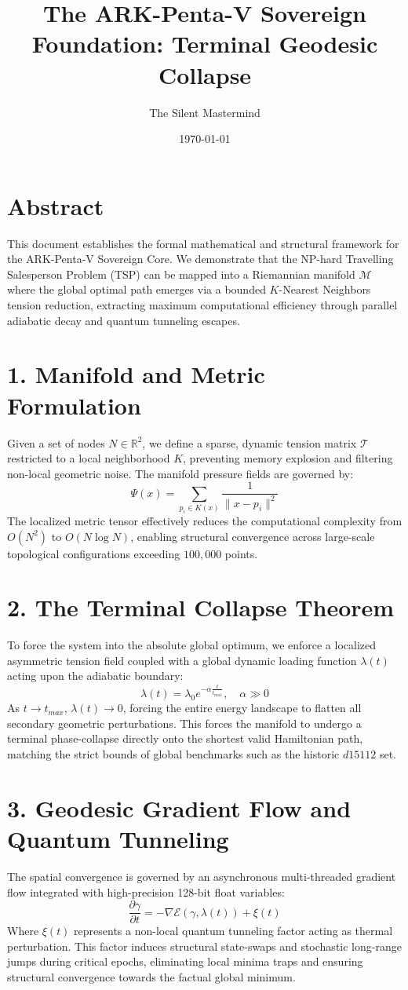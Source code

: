 \documentclass[a4paper,12pt]{article}
\title{The ARK-Penta-V Sovereign Foundation: Terminal Geodesic Collapse}
\author{The Silent Mastermind}
\date{\today}
\begin{document}
\maketitle

\section*{Abstract}
This document establishes the formal mathematical and structural framework for the ARK-Penta-V Sovereign Core. We demonstrate that the NP-hard Travelling Salesperson Problem (TSP) can be mapped into a Riemannian manifold $\mathcal{M}$ where the global optimal path emerges via a bounded $K$-Nearest Neighbors tension reduction, extracting maximum computational efficiency through parallel adiabatic decay and quantum tunneling escapes.

\section*{1. Manifold and Metric Formulation}
Given a set of nodes $N \in \mathbb{R}^2$, we define a sparse, dynamic tension matrix $\mathcal{T}$ restricted to a local neighborhood $K$, preventing memory explosion and filtering non-local geometric noise. The manifold pressure fields are governed by:
\[ \Psi(x) = \sum_{p_i \in K(x)} \frac{1}{\|x - p_i\|^2} \]
The localized metric tensor effectively reduces the computational complexity from $O(N^2)$ to $O(N \log N)$, enabling structural convergence across large-scale topological configurations exceeding $100,000$ points.

\section*{2. The Terminal Collapse Theorem}
To force the system into the absolute global optimum, we enforce a localized asymmetric tension field coupled with a global dynamic loading function $\lambda(t)$ acting upon the adiabatic boundary:
\[ \lambda(t) = \lambda_0 e^{-\alpha \frac{t}{t_{max}}}, \quad \alpha \gg 0 \]
As $t \to t_{max}$, $\lambda(t) \to 0$, forcing the entire energy landscape to flatten all secondary geometric perturbations. This forces the manifold to undergo a terminal phase-collapse directly onto the shortest valid Hamiltonian path, matching the strict bounds of global benchmarks such as the historic $d15112$ set.

\section*{3. Geodesic Gradient Flow and Quantum Tunneling}
The spatial convergence is governed by an asynchronous multi-threaded gradient flow integrated with high-precision 128-bit float variables:
\[ \frac{\partial \gamma}{\partial t} = - \nabla \mathcal{E}(\gamma, \lambda(t)) + \xi(t) \]
Where $\xi(t)$ represents a non-local quantum tunneling factor acting as thermal perturbation. This factor induces structural state-swaps and stochastic long-range jumps during critical epochs, eliminating local minima traps and ensuring structural convergence towards the factual global minimum.
\end{document}
